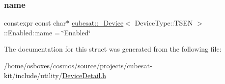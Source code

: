 \subsubsection{\texorpdfstring{name}{name}}
{\footnotesize\ttfamily constexpr const char$\ast$ \hyperlink{structcubesat_1_1__Device}{cubesat\+::\+\_\+\+Device}$<$ Device\+Type\+::\+T\+S\+EN $>$\+::Enabled\+::name = \char`\"{}Enabled\char`\"{}\hspace{0.3cm}{\ttfamily [static]}}



The documentation for this struct was generated from the following file\+:\begin{DoxyCompactItemize}
\item 
/home/osboxes/cosmos/source/projects/cubesat-\/kit/include/utility/\hyperlink{DeviceDetail_8h}{Device\+Detail.\+h}\end{DoxyCompactItemize}
